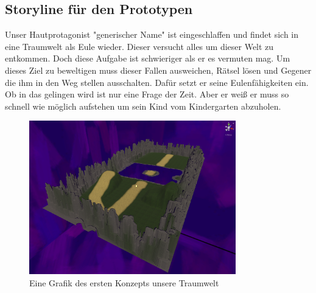 \subsection{Storyline für den Prototypen}
Unser Hautprotagonist "generischer Name" ist eingeschlaffen und findet sich in eine Traumwelt als Eule wieder. Dieser versucht alles um dieser Welt zu entkommen. Doch diese Aufgabe ist schwieriger als er es vermuten mag. Um dieses Ziel zu beweltigen muss dieser Fallen ausweichen, Rätsel lösen und Gegener die ihm in den Weg stellen ausschalten. Dafür setzt er seine Eulenfähigkeiten ein. Ob in das gelingen wird ist nur eine Frage der Zeit. Aber er weiß er muss so schnell wie möglich aufstehen um sein Kind vom Kindergarten abzuholen. 


\begin{figure}[H]
    \centering
    \includegraphics[width=0.8\textwidth]{chapters/15/images/Dreamworld.png}
    \caption{Eine Grafik des ersten Konzepts unsere Traumwelt}
    \label{UST-7}
\end{figure}

